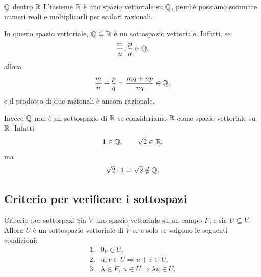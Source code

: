 \documentclass[a4paper]{article}
\begin{document}
\begin{snippetexample}{\(\mathbb{Q}\) dentro \(\mathbb{R}\)}
    L'insieme \(\mathbb{R}\) è uno spazio vettoriale su \(\mathbb{Q}\), perché possiamo sommare numeri reali e moltiplicarli per scalari razionali.

    In questo spazio vettoriale, \(\mathbb{Q}\subseteq\mathbb{R}\) è un sottospazio vettoriale. Infatti, se
    \[
        \frac{m}{n},\frac{p}{q}\in\mathbb{Q},
    \]
    allora
    \[
        \frac{m}{n}+\frac{p}{q}
        =
        \frac{mq+np}{nq}\in\mathbb{Q},
    \]
    e il prodotto di due razionali è ancora razionale.

    Invece \(\mathbb{Q}\) non è un sottospazio di \(\mathbb{R}\) se consideriamo \(\mathbb{R}\) come spazio vettoriale su \(\mathbb{R}\). Infatti
    \[
        1\in\mathbb{Q},
        \qquad
        \sqrt{2}\in\mathbb{R},
    \]
    ma
    \[
        \sqrt{2}\cdot 1=\sqrt{2}\notin\mathbb{Q}.
    \]
\end{snippetexample}

\subsection{Criterio per verificare i sottospazi}

\begin{snippetproposition}{Criterio per sottospazi}
    Sia \(V\) uno spazio vettoriale su un campo \(F\), e sia \(U\subseteq V\). Allora \(U\) è un sottospazio vettoriale di \(V\) se e solo se valgono le seguenti condizioni:
    \[
        \begin{array}{ll}
            \text{1.} & 0_V\in U,\\[1mm]
            \text{2.} & u,v\in U \Longrightarrow u+v\in U,\\[1mm]
            \text{3.} & \lambda\in F,\ u\in U \Longrightarrow \lambda u\in U.
        \end{array}
    \]
\end{snippetproposition}
\end{document}
